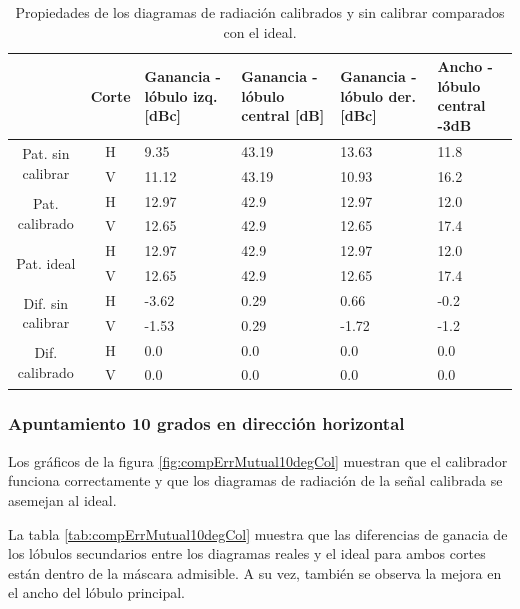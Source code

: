 \begin{table}[H]
  \footnotesize
  \centering
  \begin{tabular}{|c|c|p{2cm}|p{2.5cm}|p{2.5cm}|p{2.5cm}|}
    \cline{2-6}
    \multicolumn{1}{c|}{} & Corte & Ganancia - lóbulo izq. [dBc] & Ganancia - lóbulo central [dB] &
    Ganancia - lóbulo der. [dBc] & Ancho - lóbulo central -3dB \tabularnewline\hline
    \multirow{2}{2cm}{Pat. sin calibrar} & H & 9.35 & 43.19 & 13.63 & 11.8 \tabularnewline\cline{2-6}
     & V & 11.12 & 43.19 & 10.93 & 16.2 \tabularnewline\hline
    \multirow{2}{2cm}{Pat. calibrado} & H & 12.97 & 42.9 & 12.97 & 12.0 \tabularnewline\cline{2-6}
     & V & 12.65 & 42.9 & 12.65 & 17.4 \tabularnewline\hline
    \multirow{2}{2cm}{Pat. ideal} & H & 12.97 & 42.9 & 12.97 & 12.0 \tabularnewline\cline{2-6}
     & V & 12.65 & 42.9 & 12.65 & 17.4 \tabularnewline\hline
    \multirow{2}{2cm}{Dif. sin calibrar} & H & -3.62 & 0.29 & 0.66 & -0.2\tabularnewline\cline{2-6}
     & V & -1.53 & 0.29 & -1.72 & -1.2 \tabularnewline\hline
    \multirow{2}{2cm}{Dif. calibrado} & H & 0.0 & 0.0 & 0.0 & 0.0 \tabularnewline\cline{2-6}
     & V & 0.0 & 0.0 & 0.0 & 0.0 \tabularnewline\hline
  \end{tabular}
  \caption{Propiedades de los diagramas de radiación calibrados y sin calibrar comparados con el ideal.}
  \label{tab:compErrMutual0deg}
\end{table}


\subsubsection{Apuntamiento 10 grados en dirección horizontal}

Los gráficos de la figura \ref{fig:compErrMutual10degCol} muestran que el calibrador funciona correctamente y que los diagramas de 
radiación de la señal calibrada se asemejan al ideal. 

La tabla \ref{tab:compErrMutual10degCol} muestra que las diferencias de ganacia de los lóbulos secundarios entre los diagramas 
reales y el ideal para ambos cortes están dentro de la máscara admisible. A su vez, también se observa la mejora en el ancho 
del lóbulo principal.

